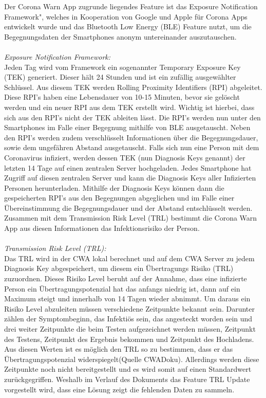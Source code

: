 \documentclass[conference]{IEEEtran}
\begin{document}
Der Corona Warn App zugrunde liegendes Feature ist das \glqq Exposure Notification Framework", 
welches in Kooperation von Google und Apple für Corona Apps entwickelt wurde und das Bluetooth Low Energy (BLE) Feature nutzt, 
um die Begegnungsdaten der Smartphones anonym untereinander auszutauschen. \\
\\
\textit{Exposure Notification Framework:}\\
Jeden Tag wird vom Framework ein sogenannter Temporary Exposure Key (TEK) generiert. Dieser hält 24 Stunden und ist ein zufällig ausgewählter Schlüssel. 
Aus diesem TEK werden Rolling Proximity Identifiers (RPI) abgeleitet. 
Diese RPI's haben eine Lebensdauer von 10-15 Minuten, bevor sie gelöscht werden und ein neuer RPI aus dem TEK erstellt wird. Wichtig ist hierbei, 
dass sich aus den RPI's nicht der TEK ableiten lässt. 
Die RPI's werden nun unter den Smartphones im Falle einer Begegnung mithilfe von BLE ausgetauscht. Neben den RPI's werden zudem verschlüsselt Informationen über die Begegnungsdauer, sowie dem ungefähren Abstand ausgetauscht.
Falls sich nun eine Person mit dem Coronavirus infiziert, werden dessen TEK (nun Diagnosis Keys genannt) der letzten 14 Tage auf einen zentralen Server hochgeladen. 
Jedes Smartphone hat Zugriff auf diesen zentralen Server und kann die Diagnosis Keys aller Infizierten Personen  herunterladen. 
Mithilfe der Diagnosis Keys können dann die gespeicherten RPI's aus den Begegnungen abgeglichen und im Falle einer Übereinstimmung die Begegnungsdauer und der Abstand entschlüsselt werden. 
Zusammen mit dem Transmission Risk Level (TRL) bestimmt die Corona Warn App aus diesen Informationen das Infektionsrisiko der Person. \\
\\
\textit{Transmission Risk Level (TRL):}\\
Das TRL wird in der CWA lokal berechnet und auf dem CWA Server zu jedem Diagnosis Key abgespeichert, um diesem ein Übertragungs Risiko (TRL) zuzuordnen. 
Dieses Risiko Level beruht auf der Annahme, dass eine infizierte Person ein Übertragungspotenzial hat das anfangs niedrig ist, 
dann auf ein Maximum steigt und innerhalb von 14 Tagen wieder abnimmt. Um daraus ein Risiko Level abzuleiten müssen verschiedene Zeitpunkte bekannt sein. 
Darunter zählen der Symptombeginn, das Infektiös sein, das angesteckt worden sein und drei weiter Zeitpunkte die beim Testen aufgezeichnet werden müssen, 
Zeitpunkt des Testens, Zeitpunkt des Ergebnis bekommen und Zeitpunkt des Hochladens. Aus diesen Werten ist es möglich den TRL so zu bestimmen, 
dass er das Übertragungspotenzial widerspiegelt(Quelle CWADoku).
Allerdings werden diese Zeitpunkte noch nicht bereitgestellt und es wird somit auf einen Standardwert zurückgegriffen. 
Weshalb im Verlauf des Dokuments das Feature TRL Update vorgestellt wird, dass eine Lösung zeigt die fehlenden Daten zu sammeln.
\end{document}
